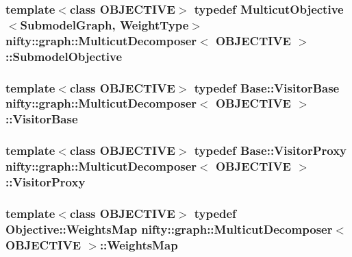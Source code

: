 \subsubsection[{Submodel\+Objective}]{\setlength{\rightskip}{0pt plus 5cm}template$<$class O\+B\+J\+E\+C\+T\+I\+V\+E$>$ typedef {\bf Multicut\+Objective}$<${\bf Submodel\+Graph}, {\bf Weight\+Type}$>$ {\bf nifty\+::graph\+::\+Multicut\+Decomposer}$<$ O\+B\+J\+E\+C\+T\+I\+V\+E $>$\+::{\bf Submodel\+Objective}}\label{classnifty_1_1graph_1_1MulticutDecomposer_a068c81973a716a49a5c38e7655e47542}
\hypertarget{classnifty_1_1graph_1_1MulticutDecomposer_a530a3efeb9ba47d5ca54ae23d38c3d5c}{}
\subsubsection[{Visitor\+Base}]{\setlength{\rightskip}{0pt plus 5cm}template$<$class O\+B\+J\+E\+C\+T\+I\+V\+E$>$ typedef {\bf Base\+::\+Visitor\+Base} {\bf nifty\+::graph\+::\+Multicut\+Decomposer}$<$ O\+B\+J\+E\+C\+T\+I\+V\+E $>$\+::{\bf Visitor\+Base}}\label{classnifty_1_1graph_1_1MulticutDecomposer_a530a3efeb9ba47d5ca54ae23d38c3d5c}
\hypertarget{classnifty_1_1graph_1_1MulticutDecomposer_abca5e422a02426a903dc28fb6538aa7c}{}
\subsubsection[{Visitor\+Proxy}]{\setlength{\rightskip}{0pt plus 5cm}template$<$class O\+B\+J\+E\+C\+T\+I\+V\+E$>$ typedef {\bf Base\+::\+Visitor\+Proxy} {\bf nifty\+::graph\+::\+Multicut\+Decomposer}$<$ O\+B\+J\+E\+C\+T\+I\+V\+E $>$\+::{\bf Visitor\+Proxy}}\label{classnifty_1_1graph_1_1MulticutDecomposer_abca5e422a02426a903dc28fb6538aa7c}
\hypertarget{classnifty_1_1graph_1_1MulticutDecomposer_a66f287d1a6a9091043e66afac5c420ec}{}
\subsubsection[{Weights\+Map}]{\setlength{\rightskip}{0pt plus 5cm}template$<$class O\+B\+J\+E\+C\+T\+I\+V\+E$>$ typedef Objective\+::\+Weights\+Map {\bf nifty\+::graph\+::\+Multicut\+Decomposer}$<$ O\+B\+J\+E\+C\+T\+I\+V\+E $>$\+::{\bf Weights\+Map}}\label{classnifty_1_1graph_1_1MulticutDecomposer_a66f287d1a6a9091043e66afac5c420ec}
\hypertarget{classnifty_1_1graph_1_1MulticutDecomposer_a92d62c2f46d4345e465bdfc3e2a0c2c8}{}
